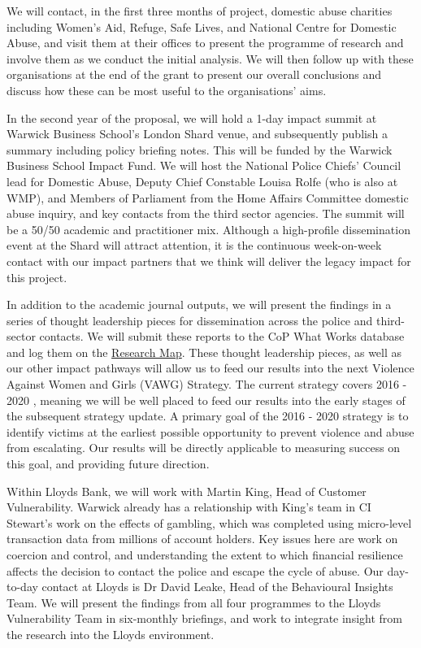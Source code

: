 \documentclass[11pt, a4paper]{article}
\begin{document}
We will contact, in the first three months of project, domestic abuse charities including Women's Aid, Refuge, Safe Lives, and National Centre for Domestic Abuse, and visit them at their offices to present the programme of research and involve them as we conduct the initial analysis. We will then follow up with these organisations at the end of the grant to present our overall conclusions and discuss how these can be most useful to the organisations' aims.

In the second year of the proposal, we will hold a 1-day impact summit at Warwick Business School's London Shard venue, and subsequently publish a summary including policy briefing notes. This will be funded by the Warwick Business School Impact Fund. We will host the National Police Chiefs' Council lead for Domestic Abuse, Deputy Chief Constable Louisa Rolfe (who is also at WMP), and Members of Parliament from the Home Affairs Committee domestic abuse inquiry, and key contacts from the third sector agencies. The summit will be a 50/50 academic and practitioner mix. Although a high-profile dissemination event at the Shard will attract attention, it is the continuous week-on-week contact with our impact partners that we think will deliver the legacy impact for this project.

In addition to the academic journal outputs, we will present the findings in a series of thought leadership pieces for dissemination across the police and third-sector contacts. We will submit these reports to the CoP What Works database and log them on the \href{https://whatworks.college.police.uk/Research/Research-Map/Pages/Research-Map.aspx}{Research Map}. These thought leadership pieces, as well as our other impact pathways will allow us to feed our results into the next Violence Against Women and Girls (VAWG) Strategy. The current strategy covers 2016 - 2020 \cite{vawag}, meaning we will be well placed to feed our results into the early stages of the subsequent strategy update. A primary goal of the 2016 - 2020 strategy is to identify victims at the earliest possible opportunity to prevent violence and abuse from escalating. Our results will be directly applicable to measuring success on this goal, and providing future direction.

Within Lloyds Bank, we will work with Martin King, Head of Customer Vulnerability. Warwick already has a relationship with King's team in CI Stewart's work on the effects of gambling, which was completed using micro-level transaction data from millions of account holders. Key issues here are work on coercion and control, and understanding the extent to which financial resilience affects the decision to contact the police and escape the cycle of abuse. Our day-to-day contact at Lloyds is Dr David Leake, Head of the Behavioural Insights Team. We will present the findings from all four programmes to the Lloyds Vulnerability Team in six-monthly briefings, and work to integrate insight from the research into the Lloyds environment. 
\end{document}
